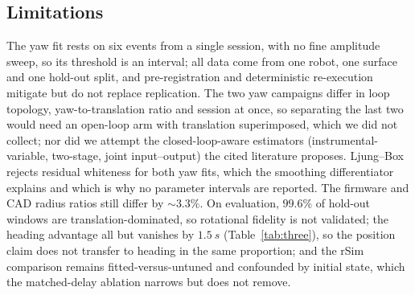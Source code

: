 \subsection{Limitations}
\label{sec:limitations}
The yaw fit rests on six events from a single session, with no fine amplitude
sweep, so its threshold is an interval; all data come from one robot, one
surface and one hold-out split, and pre-registration and deterministic
re-execution mitigate but do not replace replication. The two yaw campaigns
differ in loop topology, yaw-to-translation ratio and session at once, so
separating the last two would need an open-loop arm with translation
superimposed, which we did not collect; nor did we attempt the closed-loop-aware
estimators (instrumental-variable, two-stage, joint input--output) the cited
literature proposes. Ljung--Box rejects residual whiteness for both yaw fits,
which the smoothing differentiator explains and which is why no parameter
intervals are reported. The firmware and CAD radius ratios still differ by
${\sim}3.3\%$. On evaluation, $99.6\%$ of hold-out windows are
translation-dominated, so rotational fidelity is not validated; the heading
advantage all but vanishes by $\SI{1.5}{s}$ (Table~\ref{tab:three}), so the
position claim does not transfer to heading in the same proportion; and the
rSim comparison remains fitted-versus-untuned and confounded by
initial state, which the matched-delay ablation narrows but does not remove.

